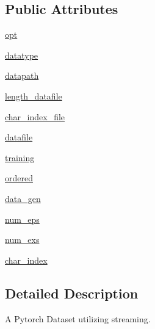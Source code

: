 \subsection*{Public Attributes}
\begin{DoxyCompactItemize}
\item 
\hyperlink{classparlai_1_1core_1_1pytorch__data__teacher_1_1StreamDataset_a131f7e729877877d35c4f5f74263e0d0}{opt}
\item 
\hyperlink{classparlai_1_1core_1_1pytorch__data__teacher_1_1StreamDataset_a872e514e289be401a00ad8a1c358773c}{datatype}
\item 
\hyperlink{classparlai_1_1core_1_1pytorch__data__teacher_1_1StreamDataset_a27ea8f73accd10ffa845ba3b3a4c189e}{datapath}
\item 
\hyperlink{classparlai_1_1core_1_1pytorch__data__teacher_1_1StreamDataset_a21044955b22bbbe21fe4ef5aca8a7ef8}{length\+\_\+datafile}
\item 
\hyperlink{classparlai_1_1core_1_1pytorch__data__teacher_1_1StreamDataset_a416c312503de875692bd9fc2b47198d4}{char\+\_\+index\+\_\+file}
\item 
\hyperlink{classparlai_1_1core_1_1pytorch__data__teacher_1_1StreamDataset_a0caa1c3c9e2d01221cc59a224ecdc107}{datafile}
\item 
\hyperlink{classparlai_1_1core_1_1pytorch__data__teacher_1_1StreamDataset_a57104c9e186b0a6d78e6d0ac4c0ab1db}{training}
\item 
\hyperlink{classparlai_1_1core_1_1pytorch__data__teacher_1_1StreamDataset_affabf282bb6e556bfc5b3d8402924b8b}{ordered}
\item 
\hyperlink{classparlai_1_1core_1_1pytorch__data__teacher_1_1StreamDataset_abb69b7392b29a63835bfd475a78553f1}{data\+\_\+gen}
\item 
\hyperlink{classparlai_1_1core_1_1pytorch__data__teacher_1_1StreamDataset_ae9315b97e4ba810e58fe1ccfedd38b98}{num\+\_\+eps}
\item 
\hyperlink{classparlai_1_1core_1_1pytorch__data__teacher_1_1StreamDataset_a2155bdd1c8cd3723c252ea05aa859a8c}{num\+\_\+exs}
\item 
\hyperlink{classparlai_1_1core_1_1pytorch__data__teacher_1_1StreamDataset_a632ed3ae104c8cee00730e9f1f827cc4}{char\+\_\+index}
\end{DoxyCompactItemize}


\subsection{Detailed Description}
\begin{DoxyVerb}A Pytorch Dataset utilizing streaming.
\end{DoxyVerb}
 

